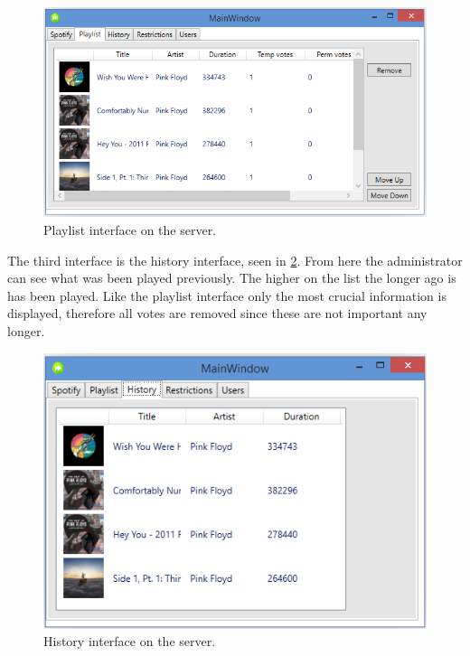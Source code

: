 \begin{figure}[hbtp]
  \centering
  \includegraphics[width=\textwidth]{Images/ServerInterfacePlaylist.png}
  \caption{Playlist interface on the server.}\label{fig:ServerInterfacePlaylist}
\end{figure}

The third interface is the history interface, seen in \cref{fig:ServerInterfaceHistory}. From here the administrator can see what was been played previously. The higher on the list the longer ago is has been played. Like the playlist interface only the most crucial information is displayed, therefore all votes are removed since these are not important any longer.

\begin{figure}[hbtp]
  \centering
  \includegraphics[width=\textwidth]{Images/ServerInterfaceHistory.png}
  \caption{History interface on the server.}\label{fig:ServerInterfaceHistory}
\end{figure}

